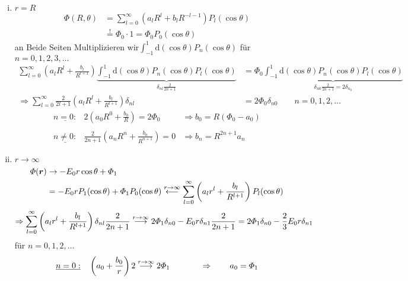 \documentclass[titlepage,11pt,a4paper,ngerman]{report}
\newcommand{\tx}[1]{\textrm{#1}}
\newcommand{\ub}[1]{\underbrace{#1}}
\newcommand{\dd}{\tx{d}}
\newcommand{\pofr}{\Phi(\vec{r})}
\renewcommand{\Phi}{\varPhi}
\newcommand{\summ}[2]{\sum_{#1}^{#2}}
\renewcommand{\vec}[1]{\boldsymbol{#1}}
\begin{document}
\begin{enumerate}[i)]
	\item $ r = R $
	\begin{align*}
	\Phi(R,\theta) &= \sum_{l=0}^{\infty} \left(a_l R^l + b_l R^{-l-1}\right) P_l(\cos\theta)\\
	&\overset{!}{=} \Phi_0 \cdot 1 = \Phi_0 P_0(\cos\theta) 
	\end{align*}
	an Beide Seiten Multiplizieren wir$ \int_{-1}^{1} \dd (\cos \theta) P_n (\cos\theta) $ für $ n = 0,1,2,3,\dots $
	\begin{align*}
	\sum_{l=0}^{\infty} \left(a_l R^l + \frac{b_l}{R^{l+1}}\right) \ub{\int_{-1}^{1} \dd (\cos\theta) P_n(\cos\theta) P_l(\cos\theta)}_{\delta_{nl} \frac{2}{2n+1}} &= \Phi_0 \ub{\int_{-1}^{1} \dd (\cos\theta) P_n(\cos\theta) P_l(\cos\theta)}_{\delta_{n0} \frac{2}{2n+1} = 2 \delta_{n_0}}\\
	\Rightarrow \summ{l = 0}{\infty} \frac{2}{2l + 1}\left(a_l R^l + \frac{b_l}{R^{l+1}}\right) \delta_{nl} &= 2 \Phi_0 \delta_{n0} \qquad n = 0, 1, 2,\dots
	\end{align*}
	$$\begin{array}{lcl}
		\underline{n = 0:} & 2\left(a_0 R^0 + \displaystyle\frac{b_0}{R}\right) = 2 \Phi_0 &\Rightarrow b_0 = R(\Phi_0 - a_0)\\
		&&\\
		\underline{n \neq 0:} & \displaystyle\frac{2}{2n+1}\left(a_n R^n + \frac{b_n}{R^{n+1}}\right) = 0 &\Rightarrow b_n = R^{2n+1}a_n
	\end{array}$$
	\item $ r \to \infty $
	\begin{align*}
	\pofr &\rightarrow -E_0 r \cos\theta + \Phi_1\\
	&= - E_0 r P_1(\cos\theta) + \Phi_1 P_0(\cos\theta) \buildrel r \to \infty \over \longleftarrow \sum_{l=0}^{\infty} \left(a_l r^l + \frac{b_l}{R^{l+1}}\right) P_l(\cos\theta)
	\end{align*}
	\begin{equation*}
	\Rightarrow \sum_{l=0}^{\infty} \left(a_l r^l + \frac{b_l}{R^{l+1}}\right) \delta_{nl} \frac{2}{2n+1} \buildrel r \to \infty \over \longrightarrow 2 \Phi_1 \delta_{n0} - E_0 r \delta_{n1} \frac{2}{2n+1} = 2 \Phi_1 \delta_{n0} - \frac{2}{3} E_0 r \delta_{n1}
	\end{equation*}
	für $ n = 0,1,2,\dots $
	\begin{align*}
	&\underline{n = 0:} \quad \left(a_0 + \frac{b_0}{r}\right) 2 \buildrel r \to \infty \over \longrightarrow 2 \Phi_1 \qquad \quad \ \ \Rightarrow \qquad a_0 = \Phi_1\\

\end{align*}
\end{enumerate}
\end{document}
